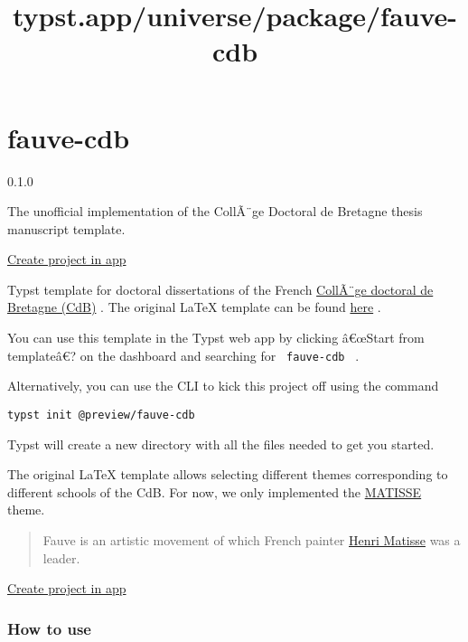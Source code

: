 \title{typst.app/universe/package/fauve-cdb}

\label{banner}
\label{template-thumbnail}

\section{fauve-cdb}\label{fauve-cdb}

{ 0.1.0 }

The unofficial implementation of the CollÃ¨ge Doctoral de Bretagne
thesis manuscript template.

\href{/app?template=fauve-cdb&version=0.1.0}{Create project in app}

\label{readme}
Typst template for doctoral dissertations of the French
\href{https://www.doctorat-bretagne.fr/}{CollÃ¨ge doctoral de Bretagne
(CdB)} . The original LaTeX template can be found
\href{https://gitlab.com/ed-matisse/latex-template}{here} .

You can use this template in the Typst web app by clicking â€œStart from
templateâ€? on the dashboard and searching for \texttt{\ fauve-cdb\ } .

Alternatively, you can use the CLI to kick this project off using the
command

\begin{verbatim}
typst init @preview/fauve-cdb
\end{verbatim}

Typst will create a new directory with all the files needed to get you
started.

The original LaTeX template allows selecting different themes
corresponding to different schools of the CdB. For now, we only
implemented the \href{https://ed-matisse.doctorat-bretagne.fr/}{MATISSE}
theme.

\begin{quote}
Fauve is an artistic movement of which French painter
\href{https://en.wikipedia.org/wiki/Henri_Matisse}{Henri Matisse} was a
leader.
\end{quote}

\href{/app?template=fauve-cdb&version=0.1.0}{Create project in app}

\subsubsection{How to use}\label{how-to-use}

